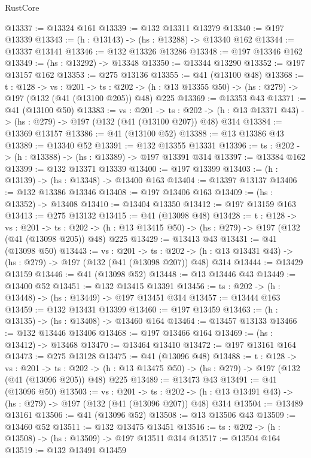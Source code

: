 \begin{lexlean}{RustCore}
\begin{coremodule}
@13337 := @13324 @161
@13339 := @132 @13311 @13279
@13340 := @197 @13339
@13343 := (h : @13143) -> (hs : @13288) -> @13340 @162
@13344 := @13337 @13141
@13346 := @132 @13326 @13286
@13348 := @197 @13346 @162
@13349 := (hs : @13292) -> @13348
@13350 := @13344 @13290
@13352 := @197 @13157 @162
@13353 := @275 @13136
@13355 := @41 (@13100 @48)
@13368 := {t : @128} ->
  {vs : @201} ->
  {ts : @202} -> (h : @13 @13355 @50) -> (hs : @279) -> @197 (@132 (@41 (@13100 @205)) @48) @225
@13369 := @13353 @43
@13371 := @41 (@13100 @50)
@13383 := {vs : @201} ->
  {ts : @202} -> (h : @13 @13371 @43) -> (hs : @279) -> @197 (@132 (@41 (@13100 @207)) @48) @314
@13384 := @13369 @13157
@13386 := @41 (@13100 @52)
@13388 := @13 @13386 @43
@13389 := @13340 @52
@13391 := @132 @13355 @13331
@13396 := {ts : @202} -> (h : @13388) -> (hs : @13389) -> @197 @13391 @314
@13397 := @13384 @162
@13399 := @132 @13371 @13339
@13400 := @197 @13399
@13403 := (h : @13139) -> (hs : @13348) -> @13400 @163
@13404 := @13397 @13137
@13406 := @132 @13386 @13346
@13408 := @197 @13406 @163
@13409 := (hs : @13352) -> @13408
@13410 := @13404 @13350
@13412 := @197 @13159 @163
@13413 := @275 @13132
@13415 := @41 (@13098 @48)
@13428 := {t : @128} ->
  {vs : @201} ->
  {ts : @202} -> (h : @13 @13415 @50) -> (hs : @279) -> @197 (@132 (@41 (@13098 @205)) @48) @225
@13429 := @13413 @43
@13431 := @41 (@13098 @50)
@13443 := {vs : @201} ->
  {ts : @202} -> (h : @13 @13431 @43) -> (hs : @279) -> @197 (@132 (@41 (@13098 @207)) @48) @314
@13444 := @13429 @13159
@13446 := @41 (@13098 @52)
@13448 := @13 @13446 @43
@13449 := @13400 @52
@13451 := @132 @13415 @13391
@13456 := {ts : @202} -> (h : @13448) -> (hs : @13449) -> @197 @13451 @314
@13457 := @13444 @163
@13459 := @132 @13431 @13399
@13460 := @197 @13459
@13463 := (h : @13135) -> (hs : @13408) -> @13460 @164
@13464 := @13457 @13133
@13466 := @132 @13446 @13406
@13468 := @197 @13466 @164
@13469 := (hs : @13412) -> @13468
@13470 := @13464 @13410
@13472 := @197 @13161 @164
@13473 := @275 @13128
@13475 := @41 (@13096 @48)
@13488 := {t : @128} ->
  {vs : @201} ->
  {ts : @202} -> (h : @13 @13475 @50) -> (hs : @279) -> @197 (@132 (@41 (@13096 @205)) @48) @225
@13489 := @13473 @43
@13491 := @41 (@13096 @50)
@13503 := {vs : @201} ->
  {ts : @202} -> (h : @13 @13491 @43) -> (hs : @279) -> @197 (@132 (@41 (@13096 @207)) @48) @314
@13504 := @13489 @13161
@13506 := @41 (@13096 @52)
@13508 := @13 @13506 @43
@13509 := @13460 @52
@13511 := @132 @13475 @13451
@13516 := {ts : @202} -> (h : @13508) -> (hs : @13509) -> @197 @13511 @314
@13517 := @13504 @164
@13519 := @132 @13491 @13459

\end{coremodule}
\end{lexlean}
